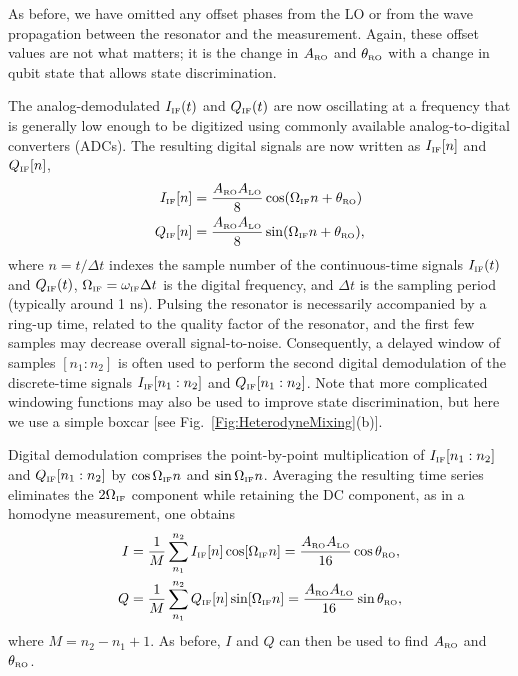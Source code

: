 \documentclass[aip,apr,twocolumn,showpacs,superscriptaddress,groupedaddress,nofootinbib,reprint]{revtex4-1}  %
\begin{document}
As before, we have omitted any offset phases from the LO or from the wave propagation between the resonator and the measurement. Again, these offset values are not what matters; it is the change in $A_{\mbox{\tiny{RO}}}$ and $\theta_{\mbox{\tiny{RO}}}$ with a change in qubit state that allows state discrimination.

The analog-demodulated $I_{\mbox{\tiny{IF}}}(t)$ and $Q_{\mbox{\tiny{IF}}}(t)$ are now oscillating at a frequency that is generally low enough to be digitized using commonly available analog-to-digital converters (ADCs). The resulting digital signals are now written as $I_{\mbox{\tiny{IF}}}[n]$ and $Q_{\mbox{\tiny{IF}}}[n]$,
%
\begin{align}
  I_{\mbox{\tiny{IF}}}[n] &= \frac{A_{\mbox{\tiny{RO}}}A_{\mbox{\tiny{LO}}}}{8} \cos (\Omega_{\mbox{\tiny{IF}}}n + \theta_{\mbox{\tiny{RO}}}) \\
  Q_{\mbox{\tiny{IF}}}[n] &= \frac{A_{\mbox{\tiny{RO}}}A_{\mbox{\tiny{LO}}}}{8} \sin (\Omega_{\mbox{\tiny{IF}}}n + \theta_{\mbox{\tiny{RO}}}),
\end{align}
%
where $n=t/\Delta t$ indexes the sample number of the continuous-time signals $I_{\mbox{\tiny{IF}}}(t)$ and $Q_{\mbox{\tiny{IF}}}(t)$, $\Omega_{\mbox{\tiny{IF}}} = \omega_{\mbox{\tiny{IF}}} \Delta t$ is the digital frequency, and $\Delta t$ is the sampling period (typically around 1 ns). Pulsing the resonator is necessarily accompanied by a ring-up time, related to the quality factor of the resonator, and the first few samples may decrease overall signal-to-noise. Consequently, a delayed window of samples $[n_1:n_2]$ is often used to perform the second digital demodulation of the discrete-time signals $I_{\mbox{\tiny{IF}}}[n_1:n_2]$ and $Q_{\mbox{\tiny{IF}}}[n_1:n_2]$. Note that more complicated windowing functions may also be used to improve state discrimination, but here we use a simple boxcar [see Fig.~\ref{Fig:HeterodyneMixing}(b)].

Digital demodulation comprises the point-by-point multiplication of $I_{\mbox{\tiny{IF}}}[n_1:n_2]$ and $Q_{\mbox{\tiny{IF}}}[n_1:n_2]$ by $\cos \Omega_{\mbox{\tiny{IF}}} n$ and $\sin \Omega_{\mbox{\tiny{IF}}} n$. Averaging the resulting time series eliminates the  $2\Omega_{\mbox{\tiny{IF}}}$ component while retaining the DC component, as in a homodyne measurement, one obtains
\begin{align}
 I &= \frac{1}{M} \sum_{n_1}^{n_2} I_{\mbox{\tiny{IF}}}[n] \cos[\Omega_{\mbox{\tiny{IF}}} n]
        = \frac{A_{\mbox{\tiny{RO}}}A_{\mbox{\tiny{LO}}}}{16} \cos \theta_{\mbox{\tiny{RO}}}, \\
 Q &= \frac{1}{M} \sum_{n_1}^{n_2} Q_{\mbox{\tiny{IF}}}[n] \sin[\Omega_{\mbox{\tiny{IF}}} n]
        = \frac{A_{\mbox{\tiny{RO}}}A_{\mbox{\tiny{LO}}}}{16} \sin \theta_{\mbox{\tiny{RO}}},
\end{align}
where $M=n_2-n_1+1$. As before, $I$ and $Q$ can then be used to find $A_{\mbox{\tiny{RO}}}$ and $\theta_{\mbox{\tiny{RO}}}$.
\end{document}
